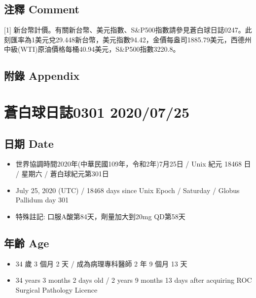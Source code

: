 \documentclass[
]{article}
\providecommand{\tightlist}{%
  \setlength{\itemsep}{0pt}\setlength{\parskip}{0pt}}
\begin{document}
\hypertarget{ux6ce8ux91cb-comment-23}{%
\subsection{注釋 Comment}\label{ux6ce8ux91cb-comment-23}}

{[}1{]}
新台幣計價。有關新台幣、美元指數、S\&P500指數請參見蒼白球日誌0247。此刻匯率為1美元兌29.448新台幣，美元指數94.42，金價每盎司1885.79美元，西德州中級(WTI)原油價格每桶40.94美元，S\&P500指數3220.8。

\hypertarget{ux9644ux9304-appendix-23}{%
\subsection{附錄 Appendix}\label{ux9644ux9304-appendix-23}}

\hypertarget{ux84bcux767dux7403ux65e5ux8a8c0301-20200725}{%
\section{蒼白球日誌0301
2020/07/25}\label{ux84bcux767dux7403ux65e5ux8a8c0301-20200725}}

\hypertarget{ux65e5ux671f-date-24}{%
\subsection{日期 Date}\label{ux65e5ux671f-date-24}}

\begin{itemize}
\tightlist
\item
  世界協調時間2020年(中華民國109年，令和2年)7月25日 / Unix 紀元 18468 日
  / 星期六 / 蒼白球紀元第301日
\item
  July 25, 2020 (UTC) / 18468 days since Unix Epoch / Saturday / Globus
  Pallidum day 301
\item
  特殊註記: 口服A酸第84天，劑量加大到20mg QD第58天
\end{itemize}

\hypertarget{ux5e74ux9f61-age-24}{%
\subsection{年齡 Age}\label{ux5e74ux9f61-age-24}}

\begin{itemize}
\tightlist
\item
  34 歲 3 個月 2 天 / 成為病理專科醫師 2 年 9 個月 13 天
\item
  34 years 3 months 2 days old / 2 years 9 months 13 days after
  acquiring ROC Surgical Pathology Licence
\end{itemize}
\end{document}
